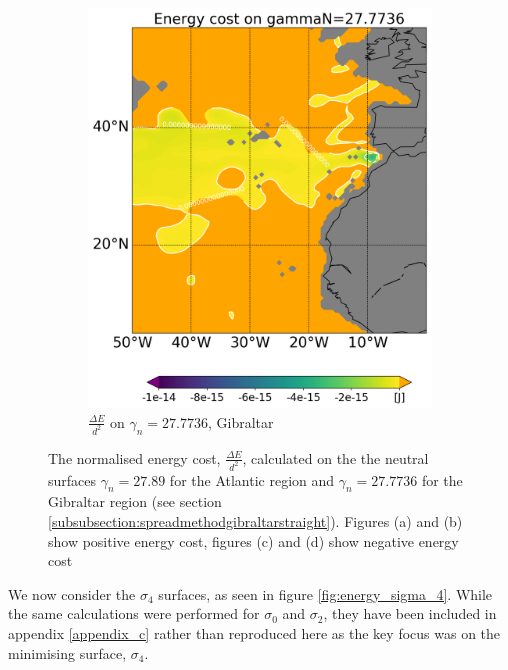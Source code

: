 \begin{figure}[htbp]
\begin{subfigure}[b]{0.4\textwidth}
         \includegraphics[width=\textwidth]{plots/energy/gibraltar_energy/Map2dcyl_neg_energy_on_gammaN_2777e-2_reg310Eto360E05Nto57N_1990to1998av_WOCE.png}
         \caption{$\frac{\Delta E}{d^2}$ on $\gamma_n = 27.7736$, Gibraltar}
         \label{fig:subplot_gibraltar_neg_energy_gamma_n}
     \end{subfigure}
     
    \caption{The normalised energy cost, $\frac{\Delta E}{d^2}$, calculated on the the neutral surfaces $\gamma_n= 27.89$ for the Atlantic region and  $\gamma_n = 27.7736$ for the Gibraltar region (see section \ref{subsubsection:spreadmethodgibraltarstraight}). Figures (a) and (b) show positive energy cost, figures (c) and (d) show negative energy cost}
    \label{fig:energy_gamma_n}
    
\end{figure}

We now consider the $\sigma_4$ surfaces, as seen in figure \ref{fig:energy_sigma_4}. While the same calculations were performed for $\sigma_0$ and $\sigma_2$, they have been included in appendix \ref{appendix_c} rather than reproduced here as the key focus was on the minimising surface, $\sigma_4$.

